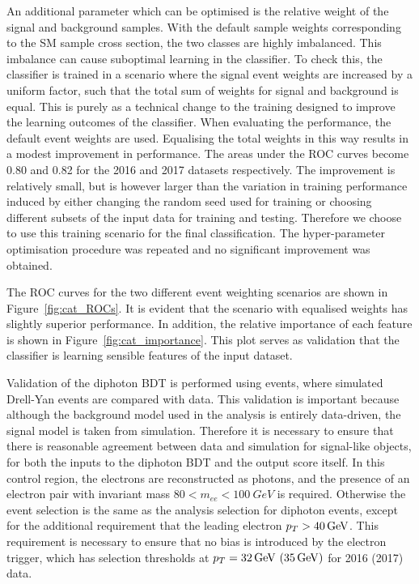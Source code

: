 An additional parameter which can be optimised is the relative weight 
of the signal and background samples.
With the default sample weights corresponding to the SM sample cross section, 
the two classes are highly imbalanced.
This imbalance can cause suboptimal learning in the classifier.
To check this, the classifier is trained in a scenario 
where the signal event weights are increased by a uniform factor, 
such that the total sum of weights for signal and background is equal.
This is purely as a technical change to the training 
designed to improve the learning outcomes of the classifier.
When evaluating the performance, the default event weights are used.
Equalising the total weights in this way results in a modest improvement in performance.
The areas under the ROC curves become 0.80 and 0.82 for the 2016 and 2017 datasets respectively.
The improvement is relatively small, 
but is however larger than the variation 
in training performance induced by either changing the random seed used for training or 
choosing different subsets of the input data for training and testing.
Therefore we choose to use this training scenario for the final classification.
The hyper-parameter optimisation procedure was repeated 
and no significant improvement was obtained.

The ROC curves for the two different event weighting scenarios are shown in Figure~\ref{fig:cat_ROCs}.
It is evident that the scenario with equalised weights has slightly superior performance.
In addition, the relative importance of each feature is shown in Figure~\ref{fig:cat_importance}.
This plot serves as validation that the classifier is learning 
sensible features of the input dataset.

Validation of the diphoton BDT is performed using \Zee events, 
where simulated Drell-Yan events are compared with data.
This validation is important because although the background model used in the analysis 
is entirely data-driven, the signal model is taken from simulation.
Therefore it is necessary to ensure that there is reasonable agreement 
between data and simulation for signal-like objects,
for both the inputs to the diphoton BDT and the output score itself.
In this \Zee control region, the electrons are reconstructed as photons, 
and the presence of an electron pair with invariant mass $80 < m_{ee} < \SI{100}{GeV}$ is required.
Otherwise the event selection is the same as the analysis selection for diphoton events, 
except for the additional requirement that the leading electron $p_T > \SI{40}{GeV}$.
This requirement is necessary to ensure that no bias is introduced by the electron trigger, 
which has selection thresholds at $p_T = \SI{32}{GeV}~(\SI{35}{GeV})$ for 2016 (2017) data.


